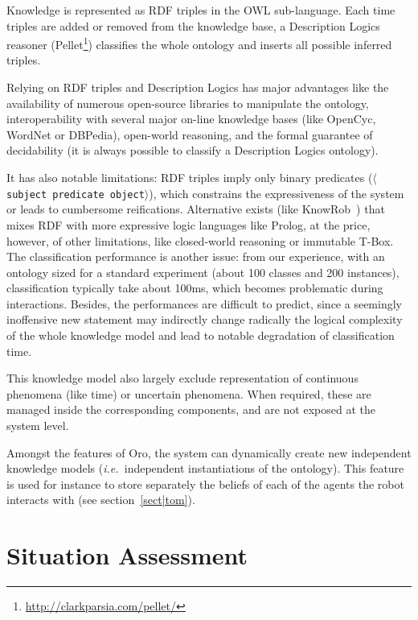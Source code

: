 \documentclass[letterpaper, 10 pt, conference]{ieeeconf}  %
\newcommand{\stmt}[1]{{\footnotesize \tt $\langle$ #1\relax$\rangle$}}
\newcommand{\ie}{{\textit{i.e.\ }}}
\begin{document}
Knowledge is represented as RDF triples in the OWL sub-language. Each
time triples are added or removed from the knowledge base, a Description
Logics reasoner ({\sc Pellet}\footnote{\url{http://clarkparsia.com/pellet/}})
classifies the whole ontology and inserts all possible inferred triples.

Relying on RDF triples and Description Logics has major advantages like the
availability of numerous open-source libraries to manipulate the ontology,
interoperability with several major on-line knowledge bases (like {\sc
OpenCyc}, {\sc WordNet} or {\sc DBPedia}), open-world reasoning, and the formal
guarantee of decidability (it is always possible to classify a Description
Logics ontology).

It has also notable limitations: RDF triples imply only binary predicates
(\stmt{subject predicate object}), which constrains the expressiveness of the
system or leads to cumbersome reifications. Alternative exists (like {\sc
KnowRob}~\cite{Tenorth2009a}) that mixes RDF with more expressive logic
languages like {\sc Prolog}, at the price, however, of other limitations, like
closed-world reasoning or immutable T-Box. The classification
performance is another issue: from our experience, with an ontology sized for a
standard experiment (about 100 classes and 200 instances), classification
typically take about 100ms, which becomes problematic during interactions.
Besides, the performances are difficult to predict, since a seemingly
inoffensive new statement may indirectly change radically the logical
complexity of the whole knowledge model and lead to notable degradation of
classification time.

This knowledge model also largely exclude representation of continuous
phenomena (like time) or uncertain phenomena. When required, these are managed
inside the corresponding components, and are not exposed at the system level.

Amongst the features of {\sc Oro}, the system can dynamically create
new independent knowledge models (\ie independent instantiations of the
ontology). This feature is used for instance to store separately the beliefs of
each of the agents the robot interacts with (see section~\ref{sect|tom}).


\section{Situation Assessment}
\label{sect|sit-ass}
\end{document}
